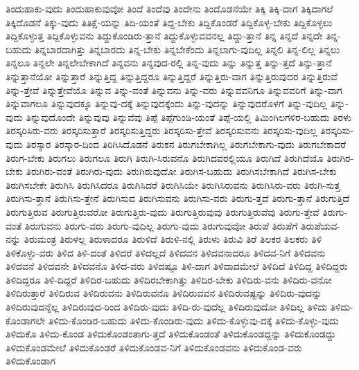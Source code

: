 {ತಿಂದುಹಾಕು-ವುದು
ತಿಂದುಹಾಕುವುವೋ
ತಿಂದೆ
ತಿಂದೆವು
ತಿಂದೇನು
ತಿಂದೊಡನೆಯೇ
ತಿಕ್ಕಿ
ತಿಕ್ಕಿ-ದಾಗ
ತಿಕ್ಕಿದಾಗಲೆ
ತಿಕ್ಕಿದೊಡನೆ
ತಿಕ್ಕು-ವುದು
ತಿತಿಕ್ಷೆ-ಯನ್ನು
ತಿದಿ-ಯಂತೆ
ತಿದ್ದ-ಬೇಕು
ತಿದ್ದಿಕೊಂಡರೆ
ತಿದ್ದಿಕೊಳ್ಳ-ಬೇಕು
ತಿದ್ದಿಕೊಳ್ಳಲು
ತಿದ್ದಿಕೊಳ್ಳುತ್ತ
ತಿದ್ದಿಕೊಳ್ಳುವನು
ತಿದ್ದುಕೊಂಡಿರು-ತ್ತಾನೆ
ತಿದ್ದುಕೊಳ್ಳುವವನಲ್ಲ
ತಿದ್ದು-ತ್ತಾನೆ
ತಿನ್ನ
ತಿನ್ನದೆ
ತಿನ್ನದೇ
ತಿನ್ನ-ಬಹುದು
ತಿನ್ನಬಾರದಾಗಿತ್ತು
ತಿನ್ನಬಾರದು
ತಿನ್ನ-ಬೇಕು
ತಿನ್ನಬೇಕೆಂದು
ತಿನ್ನಲಾಗು-ವುದಿಲ್ಲ
ತಿನ್ನಲಿ
ತಿನ್ನ-ಲಿಲ್ಲ
ತಿನ್ನಲು
ತಿನ್ನಲೂ
ತಿನ್ನಲೇ
ತಿನ್ನಲೇಬೇಕಾಗಿದೆ
ತಿನ್ನವನು
ತಿನ್ನವುದ-ರಲ್ಲಿ
ತಿನ್ನ-ವುದು
ತಿನ್ನು
ತಿನ್ನುತ್ತ
ತಿನ್ನು-ತ್ತದೆ
ತಿನ್ನು-ತ್ತಾನೆ
ತಿನ್ನುತ್ತಾನೆಯೋ
ತಿನ್ನುತ್ತಾರೆ
ತಿನ್ನುತ್ತಿದ್ದ
ತಿನ್ನುತ್ತಿದ್ದರೂ
ತಿನ್ನುತ್ತಿದ್ದರೆ
ತಿನ್ನುತ್ತಿರು-ವಾಗ
ತಿನ್ನುತ್ತಿರುವುದರ
ತಿನ್ನುತ್ತಿರುವೆ
ತಿನ್ನು-ತ್ತೇವೆ
ತಿನ್ನುತ್ತೇವೆಯೊ
ತಿನ್ನುವ
ತಿನ್ನು-ವಂತೆ
ತಿನ್ನುವನು
ತಿನ್ನು-ವರು
ತಿನ್ನುವವನಿಗೂ
ತಿನ್ನುವವರಿಗೆ
ತಿನ್ನು-ವಾಗ
ತಿನ್ನುವಾಗಲೂ
ತಿನ್ನುವುದಕ್ಕೂ
ತಿನ್ನುವು-ದಕ್ಕೆ
ತಿನ್ನುವುದಕ್ಕೆಂದು
ತಿನ್ನು-ವುದನ್ನು
ತಿನ್ನುವುದರೊಳಗೆ
ತಿನ್ನು-ವುದಿಲ್ಲ
ತಿನ್ನು-ವುದು
ತಿನ್ನುವುದೊಂದೇ
ತಿನ್ನುವುವು
ತಿನ್ನುವೆವು
ತಿಪ್ಪೆ
ತಿಪ್ಪೆಗುಂಡಿ-ಯಂತೆ
ತಿಪ್ಪೆ-ಯಲ್ಲಿ
ತಿಮಿಂಗಿಲಗಳಿರ-ಬಹುದು
ತಿರಳು
ತಿರಸ್ಕರಿಸಿರು-ವರು
ತಿರಸ್ಕರಿಸುತ್ತಾರೆ
ತಿರಸ್ಕರಿಸುತ್ತಿದ್ದರು
ತಿರಸ್ಕರಿಸು-ತ್ತೇವೆ
ತಿರಸ್ಕರಿಸುವನು
ತಿರಸ್ಕರಿಸು-ವುದಿಲ್ಲ
ತಿರಸ್ಕರಿಸು-ವುದು
ತಿರಸ್ಕಾರ
ತಿರಸ್ಕಾರ-ದಿಂದ
ತಿರಿಗಿಸಿದೊಡನೆ
ತಿರುಕನ
ತಿರುಗಬೇಕಾಗಿಲ್ಲ
ತಿರುಗಬೇಕಾಗು-ವುದು
ತಿರುಗಬೇಕಾದರೆ
ತಿರುಗ-ಬೇಕು
ತಿರುಗಲು
ತಿರುಗಲೂ
ತಿರುಗಿ
ತಿರುಗಿ-ಸಿರುವನೊ
ತಿರುಗಿದವರಲ್ಲಿಯೂ
ತಿರುಗಿದೆ
ತಿರುಗಿದೆಯೊ
ತಿರುಗಿರ-ಬೇಕು
ತಿರುಗಿರು-ವಂತೆ
ತಿರುಗಿರು-ವುದು
ತಿರುಗಿರುವುದೋ
ತಿರುಗಿಸ-ಬಹುದು
ತಿರುಗಿಸಬೇಕಾಗಿದೆ
ತಿರುಗಿಸ-ಬೇಕು
ತಿರುಗಿಸಬೇಕೇ
ತಿರುಗಿಸಿ
ತಿರುಗಿಸಿದರೂ
ತಿರುಗಿಸಿದರೆ
ತಿರುಗಿಸಿಯೇ
ತಿರುಗಿಸಿರುವನು
ತಿರುಗಿಸಿರು-ವರು
ತಿರುಗಿ-ಸುತ್ತ
ತಿರುಗಿಸು-ತ್ತಾನೆ
ತಿರುಗಿಸು-ತ್ತೇನೆ
ತಿರುಗಿಸುವ
ತಿರುಗಿಸುವನು
ತಿರುಗಿಸು-ವರು
ತಿರುಗು-ತ್ತದೆ
ತಿರುಗು-ತ್ತಾನೆ
ತಿರುಗುತ್ತಿದೆ
ತಿರುಗುತ್ತಿರುವ
ತಿರುಗುತ್ತಿರುವರೋ
ತಿರುಗುತ್ತಿರು-ವುದು
ತಿರುಗುತ್ತಿರುವುವು
ತಿರುಗುತ್ತಿರುವೆವು
ತಿರುಗು-ತ್ತೇವೆ
ತಿರುಗು-ವಂತೆ
ತಿರುಗುವನು
ತಿರುಗು-ವರು
ತಿರುಗು-ವುದಿಲ್ಲ
ತಿರುಗು-ವುದು
ತಿರುಗುವುವೋ
ತಿರುಪೆ
ತಿರುಪೆಗೆ
ತಿರುಪೆಯವ-ನನ್ನು
ತಿರುಮಂತ್ರ
ತಿರುಳಲ್ಲ
ತಿರುಳಾದರೂ
ತಿರುಳಿದೆ
ತಿರುಳಿ-ನಲ್ಲಿ
ತಿರುಳು
ತಿರುವಿ
ತಿರೆ
ತಿಲಕರ
ತಿಲಕರು
ತಿಳಿ
ತಿಳಿಕೊಳ್ಳು-ವರು
ತಿಳಿದ
ತಿಳಿ-ದಂತೆ
ತಿಳಿದರೆ
ತಿಳಿದಲ್ಲದೆ
ತಿಳಿದವನ
ತಿಳಿದವನಾದರೂ
ತಿಳಿದವ-ನಿಗೆ
ತಿಳಿದವನು
ತಿಳಿದವನೆ
ತಿಳಿದವನೇ
ತಿಳಿದವನೊ
ತಿಳಿದ-ವರು
ತಿಳಿದಷ್ಟೂ
ತಿಳಿ-ದಾಗ
ತಿಳಿದಾದಮೇಲೆ
ತಿಳಿದಿದೆ
ತಿಳಿದಿದ್ದ
ತಿಳಿದಿದ್ದರು
ತಿಳಿದಿದ್ದರೂ
ತಿಳಿ-ದಿದ್ದರೆ
ತಿಳಿದಿರ-ಬಹುದು
ತಿಳಿದಿರಬೇಕಾಗಿತ್ತು
ತಿಳಿದಿರ-ಬೇಕು
ತಿಳಿದಿರು-ವನು
ತಿಳಿದಿರು-ವನೋ
ತಿಳಿದಿರುತ್ತಾರೆ
ತಿಳಿದಿರುವ
ತಿಳಿದಿರುವನು
ತಿಳಿದಿರುವನೊ
ತಿಳಿದಿರುವವನ
ತಿಳಿದಿರುವಷ್ಟನ್ನು
ತಿಳಿದಿರು-ವುದನ್ನು
ತಿಳಿದಿರುವುದನ್ನೆಲ್ಲ
ತಿಳಿದಿರುವುದ-ರಿಂದ
ತಿಳಿದಿರು-ವುದು
ತಿಳಿದಿ-ರು-ವುದೆಲ್ಲ
ತಿಳಿದಿರುವುದೋ
ತಿಳಿದಿಲ್ಲ
ತಿಳಿದು
ತಿಳಿದು-ಕೊಂಡಾಗಲೇ
ತಿಳಿದು-ಕೊಂಡಿರ-ಬಹುದು
ತಿಳಿದು-ಕೊಂಡಿರು-ವುದು
ತಿಳಿದು-ಕೊಳ್ಳುವು-ದಕ್ಕೆ
ತಿಳಿದು-ಕೊಳ್ಳು-ವುದು
ತಿಳಿದುಕೊ
ತಿಳಿದು-ಕೊಂಡ
ತಿಳಿದುಕೊಂಡಂತಾಗು-ತ್ತದೆ
ತಿಳಿದುಕೊಂಡಂತೆ
ತಿಳಿದುಕೊಂಡದ್ದನ್ನು
ತಿಳಿದುಕೊಂಡದ್ದು
ತಿಳಿದುಕೊಂಡಮೇಲೆ
ತಿಳಿದುಕೊಂಡರೆ
ತಿಳಿದುಕೊಂಡವ-ನಿಗೆ
ತಿಳಿದುಕೊಂಡವನು
ತಿಳಿದುಕೊಂಡ-ವರು
ತಿಳಿದುಕೊಂಡಾಗ
}
